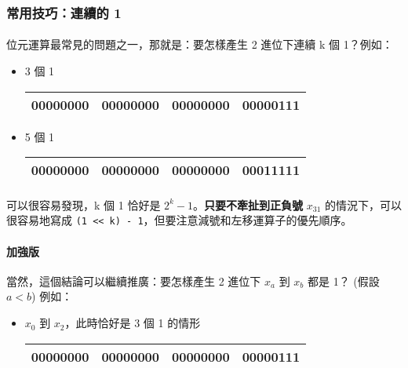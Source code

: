 \documentclass[12pt,a4paper,oneside]{article}
\begin{document}
\begin{CJK}{UTF8}{bkai}
\subsubsection{常用技巧：連續的 1}

\paragraph{}位元運算最常見的問題之一，那就是：要怎樣產生 2 進位下連續 k 個 1？例如：
\begin{itemize}
\item 3 個 1
\begin{table}[h!]
\centering
\begin{tabular}{|c|c|c|c|}
\hline
00000000 & 00000000 & 00000000 & 00000\textbf{111}\\
\hline
\end{tabular}
\end{table}

\item 5 個 1
\begin{table}[h!]
\centering
\begin{tabular}{|c|c|c|c|}
\hline
00000000 & 00000000 & 00000000 & 000\textbf{11111}\\
\hline
\end{tabular}
\end{table}
\end{itemize}

\paragraph{}可以很容易發現，k 個 1 恰好是 $2^k-1$。\textbf{只要不牽扯到正負號} $x_{31}$ 的情況下，可以很容易地寫成 \lstinline!(1 << k) - 1!，但要注意減號和左移運算子的優先順序。
\paragraph{加強版}當然，這個結論可以繼續推廣：要怎樣產生 2 進位下 $x_a$ 到 $x_b$ 都是 1？ (假設 $a<b$) 例如：

\begin{itemize}
\item $x_0$ 到 $x_2$，此時恰好是 3 個 1 的情形
\begin{table}[h!]
\centering
\begin{tabular}{|c|c|c|c|}
\hline
00000000 & 00000000 & 00000000 & 00000\textbf{111}\\
\hline
\end{tabular}
\end{table}


\end{itemize}
\end{CJK}
\end{document}
